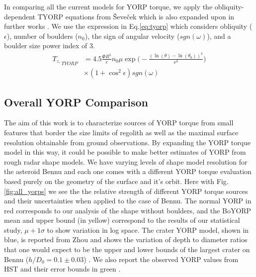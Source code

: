 In comparing all the current models for YORP torque, we apply the obliquity-dependent TYORP equations from Ševeček which is also expanded upon in further works \citep{Sevecek2016} \citep{Golubov2019}. We use the expression in Eq.\ref{eq:tyorp} which considers obliquity ($\epsilon$), number of boulders ($n_0$), the sign of angular velocity ($sgn(\omega)$), and a boulder size power index of 3. 
\begin{equation}\label{eq:tyorp}
    \begin{split}
    {T_{z,}}_{TYORP} & = 4.5 \frac{\Phi R^3}{c}n_0 \mu \exp \Bigg( -\frac{(\ln(\theta)-\ln(\theta_0))^2}{\nu^2}\Bigg)\\
    & \times (1+\cos^2\epsilon)sgn(\omega)
    \end{split}
\end{equation}

\subsection{Overall YORP Comparison}


The aim of this work is to characterize sources of YORP torque from small features that border the size limits of regolith as well as the maximal surface resolution obtainable from ground observations. By expanding the YORP torque model in this way, it could be possible to make better estimates of YORP from rough radar shape models. We have varying levels of shape model resolution for the asteroid Bennu and each one comes with a different YORP torque evaluation based purely on the geometry of the surface and it's orbit. Here with Fig. \ref{fig:all_yorps} we see the the relative strength of different YORP torque sources and their uncertainties when applied to the case of Bennu. The normal YORP in red corresponds to our analysis of the shape without boulders, and the BoYORP mean and upper bound (in yellow) correspond to the results of our statistical study, $\mu+1\sigma$ to show variation in log space. The crater YORP model, shown in blue, is reported from Zhou and shows the variation  of depth to diameter ratios that one would expect to be the upper and lower bounds of the largest crater on Bennu ($h/D_0 = 0.1\pm0.03$) \citep{Zhou2022} \citep{Daly2020a}. We also report the observed YORP values from HST and their error bounds in green \citep{Nolan2019}.

